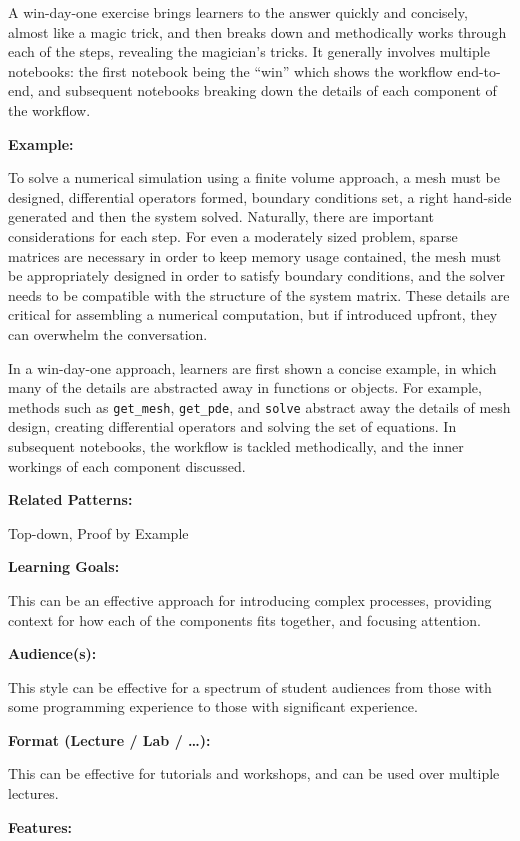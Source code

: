 \documentclass[]{book}
\begin{document}
A win-day-one exercise brings learners to the answer quickly and
concisely, almost like a magic trick, and then breaks down and
methodically works through each of the steps, revealing the magician's
tricks. It generally involves multiple notebooks: the first notebook
being the ``win'' which shows the workflow end-to-end, and subsequent
notebooks breaking down the details of each component of the workflow.

\textbf{Example:}

To solve a numerical simulation using a finite volume approach, a mesh
must be designed, differential operators formed, boundary conditions
set, a right hand-side generated and then the system solved. Naturally,
there are important considerations for each step. For even a moderately
sized problem, sparse matrices are necessary in order to keep memory
usage contained, the mesh must be appropriately designed in order to
satisfy boundary conditions, and the solver needs to be compatible with
the structure of the system matrix. These details are critical for
assembling a numerical computation, but if introduced upfront, they can
overwhelm the conversation.

In a win-day-one approach, learners are first shown a concise example,
in which many of the details are abstracted away in functions or
objects. For example, methods such as \texttt{get\_mesh},
\texttt{get\_pde}, and \texttt{solve} abstract away the details of mesh
design, creating differential operators and solving the set of
equations. In subsequent notebooks, the workflow is tackled
methodically, and the inner workings of each component discussed.

\textbf{Related Patterns:}

Top-down, Proof by Example

\textbf{Learning Goals:}

This can be an effective approach for introducing complex processes,
providing context for how each of the components fits together, and
focusing attention.

\textbf{Audience(s):}

This style can be effective for a spectrum of student audiences from
those with some programming experience to those with significant
experience.

\textbf{Format (Lecture / Lab / \ldots{}):}

This can be effective for tutorials and workshops, and can be used over
multiple lectures.

\textbf{Features:}
\end{document}

